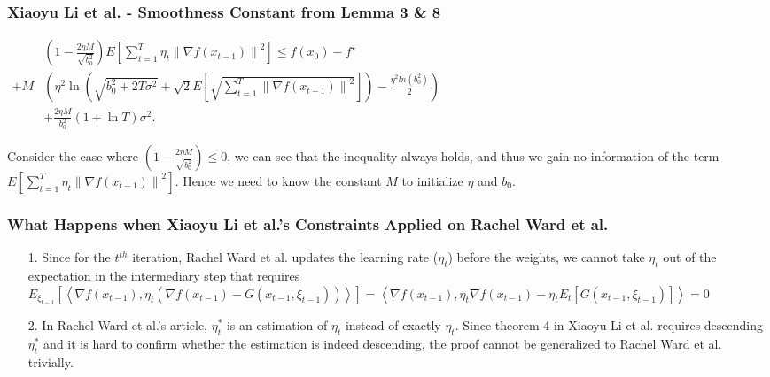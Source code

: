 \documentclass{beamer}
\begin{document}
\begin{frame}
\frametitle{Xiaoyu Li et al. - Smoothness Constant from Lemma 3 \& 8}

\par\vspace{3mm}
$\begin{aligned} & \left(1-\frac{2 \eta M}{\sqrt{b_0^2}}\right) E\left[\sum_{t=1}^T \eta_t\left\|\nabla f\left(x_{t-1}\right)\right\|^2\right] \leq f\left(x_0\right)-f^{\star} \\  +M &\left(\eta^2 \ln \left(\sqrt{b_0^2+2 T \sigma^2}+\sqrt{2} E\left[\sqrt{\sum_{t=1}^T \left\|\nabla f\left(x_{t-1}\right)\right\|^2}\right]\right)-\frac{\eta^2 ln(b_0^2)}{2}\right) \\ & +\frac{2 \eta M}{b_0^2}(1+\ln T) \sigma^2 .\end{aligned}$\par
Consider the case where $\left(1-\frac{2 \eta M}{\sqrt{b_0^2}}\right) \leq 0$, we can see that the inequality always holds, and thus we gain no information of the term $E\left[\sum_{t=1}^T \eta_t\left\|\nabla f\left(x_{t-1}\right)\right\|^2\right]$. Hence we need to know the constant $M$ to initialize $\eta$ and $b_0$. 
\end{frame}

\begin{frame}
\frametitle{What Happens when Xiaoyu Li et al.'s Constraints Applied on Rachel Ward et al.}
\begin{enumerate}
        \item [1.] Since for the $t^{th}$ iteration, Rachel Ward et al. updates the learning rate ($\eta_t$) before the weights, we cannot take $\eta_t$ out of the expectation in the intermediary step that requires $E_{\xi_{t-1}}\left[\left\langle\nabla f\left(x_{t-1}\right), \eta_t\left(\nabla f\left(x_{t-1}\right)-G\left(x_{t-1}, \xi_{t-1}\right)\right)\right\rangle\right]=\left\langle\nabla f\left(x_{t-1}\right), \eta_t \nabla f\left(x_{t-1}\right)-\eta_t E_t\left[G\left(x_{t-1}, \xi_{t-1}\right)\right]\right\rangle=0$
        \par\vspace{3mm}
        \item [2.] In Rachel Ward et al.'s article, $\eta_t^*$ is an estimation of $\eta_t$ instead of exactly $\eta_t$. Since theorem 4 in Xiaoyu Li et al. requires descending $\eta_t^*$ and it is hard to confirm whether the estimation is indeed descending, the proof cannot be generalized to Rachel Ward et al. trivially.
\end{enumerate}
\end{frame}
\end{document}
